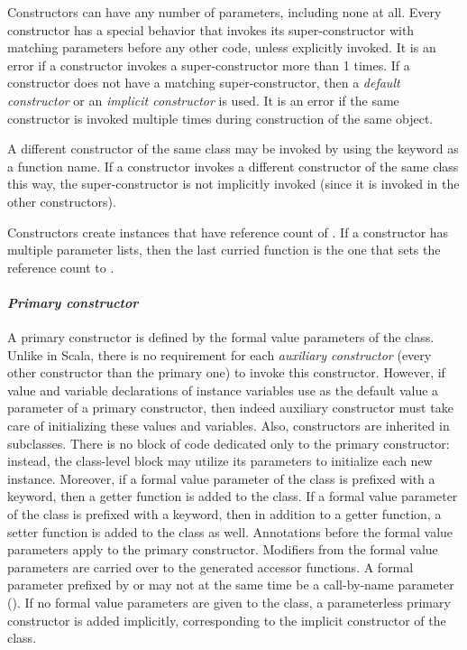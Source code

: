 Constructors can have any number of parameters, including none at all. Every constructor has a special behavior that invokes its super-constructor with matching parameters before any other code, unless explicitly invoked. It is an error if a constructor invokes a super-constructor more than 1 times. If a constructor does not have a matching super-constructor, then a {\em default constructor} or an {\em implicit constructor} is used. It is an error if the same constructor is invoked multiple times during construction of the same object. 

A different constructor of the same class may be invoked by using the  keyword as a function name. If a constructor invokes a different constructor of the same class this way, the super-constructor is not implicitly invoked (since it is invoked in the other constructors). 

Constructors create instances that have reference count of . If a constructor has multiple parameter lists, then the last curried function is the one that sets the reference count to . 

\paragraph{\em Primary constructor}
A primary constructor is defined by the formal value parameters of the class. Unlike in Scala, there is no requirement for each {\em auxiliary constructor} (every other constructor than the primary one) to invoke this constructor. However, if value and variable declarations of instance variables use as the default value a parameter of a primary constructor, then indeed auxiliary constructor must take care of initializing these values and variables. Also, constructors are inherited in subclasses. There is no block of code dedicated only to the primary constructor: instead, the class-level block may utilize its parameters to initialize each new instance. Moreover, if a formal value parameter of the class is prefixed with a  keyword, then a getter function is added to the class. If a formal value parameter of the class is prefixed with a  keyword, then in addition to a getter function, a setter function is added to the class as well. Annotations before the formal value parameters apply to the primary constructor. Modifiers from the formal value parameters are carried over to the generated accessor functions. A formal parameter prefixed by  or  may not at the same time be a call-by-name parameter (). If no formal value parameters are given to the class, a parameterless primary constructor is added implicitly, corresponding to the implicit constructor of the class. 

